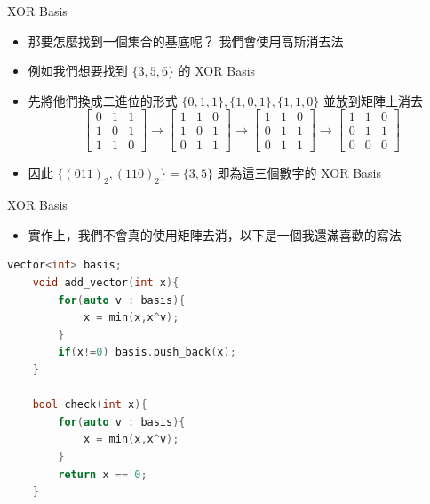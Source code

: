 \documentclass[aspectratio=169]{beamer}
\begin{document}
    \begin{frame}{XOR Basis}
        \begin{itemize}
            \item 那要怎麼找到一個集合的基底呢？ 我們會使用高斯消去法
            \item 例如我們想要找到 $\{3,5,6\}$ 的 XOR Basis
            \item 先將他們換成二進位的形式 $\{0,1,1\}, \{1,0,1\}, \{1,1,0\}$ 並放到矩陣上消去
            $$\begin{bmatrix}0 & 1 & 1 \\ 1 & 0 & 1 \\ 1 & 1 & 0\end{bmatrix} \rightarrow \begin{bmatrix}1 & 1 & 0 \\ 1 & 0 & 1 \\ 0 & 1 & 1\end{bmatrix} \rightarrow \begin{bmatrix}1 & 1 & 0 \\ 0 & 1 & 1 \\ 0 & 1 & 1\end{bmatrix} \rightarrow \begin{bmatrix}1 & 1 & 0 \\ 0 & 1 & 1 \\ 0 & 0 & 0\end{bmatrix}$$
            \item 因此 $\{(011)_2, (110)_2\} = \{3,5\}$ 即為這三個數字的 XOR Basis
        \end{itemize}
    \end{frame}
    
    \begin{frame}[fragile]{XOR Basis}
        \begin{itemize}
            \item 實作上，我們不會真的使用矩陣去消，以下是一個我還滿喜歡的寫法
        \end{itemize}
        \begin{lstlisting}[language=C++, basicstyle=\ttfamily \small]
    vector<int> basis;
    void add_vector(int x){
        for(auto v : basis){
            x = min(x,x^v);
        }
        if(x!=0) basis.push_back(x);
    }
    
    bool check(int x){
        for(auto v : basis){
            x = min(x,x^v);
        }
        return x == 0;
    }
        \end{lstlisting}
    \end{frame}
    
\end{document}
